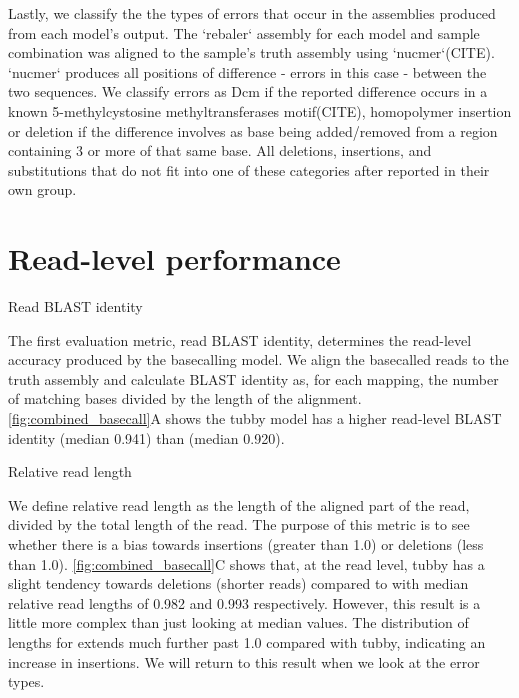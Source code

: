 Lastly, we classify the the types of errors that occur in the assemblies produced from each model's output. The `rebaler` assembly for each model and sample combination was aligned to the sample's truth assembly using `nucmer`(CITE). `nucmer` produces all positions of difference - errors in this case - between the two sequences. We classify errors as Dcm if the reported difference occurs in a known 5-methylcystosine methyltransferases motif(CITE), homopolymer insertion or deletion if the difference involves as base being added/removed from a region containing 3 or more of that same base. All deletions, insertions, and substitutions that do not fit into one of these categories after reported in their own group.

\section{Read-level performance}

Read BLAST identity

The first evaluation metric, read BLAST identity, determines the read-level accuracy produced by the basecalling model. We align the basecalled reads to the truth assembly and calculate BLAST identity as, for each mapping, the number of matching bases divided by the length of the alignment. \autoref{fig:combined_basecall}A shows the tubby model has a higher read-level BLAST identity (median 0.941) than \guppy{} (median 0.920).

Relative read length

We define relative read length as the length of the aligned part of the read, divided by the total length of the read. The purpose of this metric is to see whether there is a bias towards insertions (greater than 1.0) or deletions (less than 1.0). \autoref{fig:combined_basecall}C shows that, at the read level, tubby has a slight tendency towards deletions (shorter reads) compared to \guppy{} with median relative read lengths of 0.982 and 0.993 respectively. However, this result is a little more complex than just looking at median values. The distribution of lengths for \guppy{} extends much further past 1.0 compared with tubby, indicating an increase in insertions. We will return to this result when we look at the error types.

